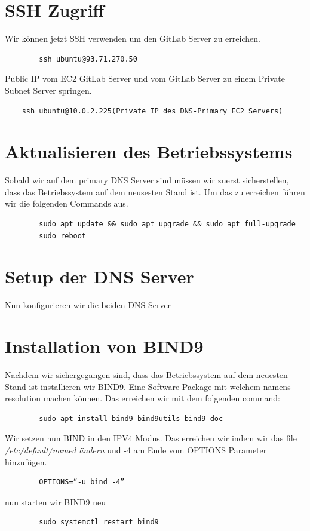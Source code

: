 \documentclass[a4paper,12pt]{article}
\begin{document}
\section{SSH Zugriff}
Wir können jetzt SSH verwenden um den GitLab Server zu erreichen.
\begin{verbatim}
		ssh ubuntu@93.71.270.50
\end{verbatim}
Public IP vom EC2 GitLab Server und vom GitLab Server zu einem Private Subnet Server springen.

\begin{verbatim}
	ssh ubuntu@10.0.2.225(Private IP des DNS-Primary EC2 Servers)
\end{verbatim}


\section{Aktualisieren des Betriebssystems}

Sobald wir auf dem primary DNS Server sind müssen wir zuerst sicherstellen, dass das Betriebssystem auf dem neusesten Stand ist.
Um das zu erreichen führen wir die folgenden Commands aus.
\begin{verbatim}
		sudo apt update && sudo apt upgrade && sudo apt full-upgrade
		sudo reboot
\end{verbatim}


\section{Setup der DNS Server}
Nun konfigurieren wir die beiden DNS Server


\section{Installation von BIND9}
Nachdem wir sichergegangen sind, dass das Betriebssystem auf dem neuesten Stand ist installieren wir BIND9. Eine Software Package mit welchem namens resolution machen können. Das erreichen wir mit dem folgenden command:
\begin{verbatim}
		sudo apt install bind9 bind9utils bind9-doc
\end{verbatim}

Wir setzen nun BIND in den IPV4 Modus. Das erreichen wir indem wir das file \textit{/etc/default/named ändern} und -4 am Ende vom OPTIONS Parameter hinzufügen.
\begin{verbatim}
		OPTIONS=“-u bind -4”
\end{verbatim}
nun starten wir BIND9 neu
\begin{verbatim}
		sudo systemctl restart bind9
\end{verbatim}
\end{document}
